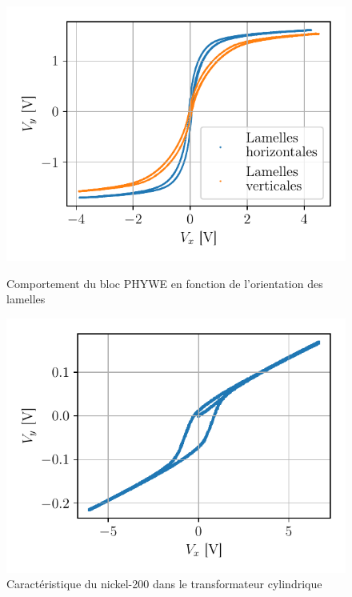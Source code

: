 \begin{figure}[h]
    \begin{minipage}{0.48\linewidth}
        \centering
        \includegraphics[width=\linewidth]{figures/vertical_vs_horizontal.pdf}
        \caption{Comportement du bloc PHYWE en fonction de l'orientation des lamelles}
        \label{fig:orientation_bloc}
    \end{minipage}
    \hfill
    \begin{minipage}{0.48\linewidth}
        \centering
        \includegraphics[width=\linewidth]{figures/G1-cylindre-nickel200.pdf}
        \caption{Caractéristique du nickel-200 dans le transformateur cylindrique}
        \label{fig:nickel-200}
    \end{minipage}
\end{figure}


